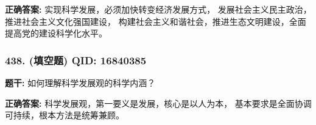 \documentclass[12pt,UTF8]{ctexart}
\begin{document}
\textbf{正确答案:}
实现科学发展，必须加快转变经济发展方式， 发展社会主义民主政治，推进社会主义文化强国建设， 构建社会主义和谐社会，推进生态文明建设，全面提高党的建设科学化水平。

\vspace{0.3em}\hrulefill\vspace{0.7em}

\subsubsection*{438. (填空题) \small QID: 16840385}

\textbf{题干:}
如何理解科学发展观的科学内涵？

\textbf{正确答案:}
科学发展观，第一要义是发展，核心是以人为本， 基本要求是全面协调可持续，根本方法是统筹兼顾。

\vspace{0.3em}\hrulefill\vspace{0.7em}
\end{document}
